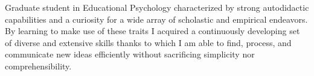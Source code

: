 \begin{minipage}[t]{1\linewidth}
	\vspace{0.25cm}
	Graduate student in Educational Psychology characterized by strong autodidactic capabilities and a curiosity for a wide array of scholastic and empirical  endeavors. By learning to make use of these traits I acquired a continuously developing set of diverse and extensive skills thanks to which I am able to find, process, and communicate new ideas efficiently without sacrificing simplicity nor comprehensibility.  
\end{minipage} 
